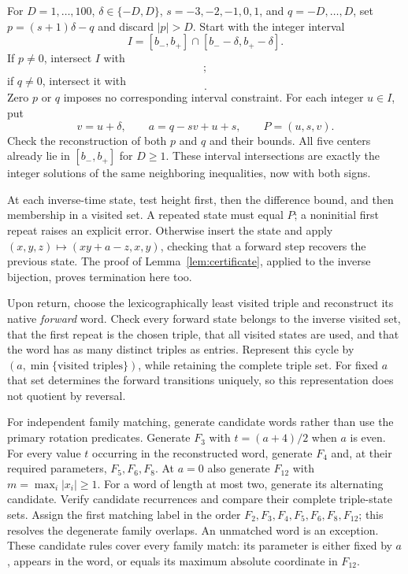 For $D=1,\ldots,100$, $\delta\in\{-D,D\}$,
$s=-3,-2,-1,0,1$, and $q=-D,\ldots,D$, set
$p=(s+1)\delta-q$ and discard $|p|>D$.
Start with the integer interval
\begin{equation}
 I=[b_-,b_+]\cap[b_--\delta,b_+-\delta].
 \label{eq:interval0}
\end{equation}
If $p\ne0$, intersect $I$ with
\begin{equation}
 [-1-\lfloor2D/|p|\rfloor,-1+\lfloor2D/|p|\rfloor];
 \label{eq:intervalp}
\end{equation}
if $q\ne0$, intersect it with
\begin{equation}
 [-1-\delta-\lfloor2D/|q|\rfloor,
  -1-\delta+\lfloor2D/|q|\rfloor].
 \label{eq:intervalq}
\end{equation}
Zero $p$ or $q$ imposes no corresponding interval constraint.
For each integer $u\in I$, put
\begin{equation}
 v=u+\delta,\qquad a=q-sv+u+s,
 \qquad P=(u,s,v).
 \label{eq:independentseed}
\end{equation}
Check the reconstruction of both $p$ and $q$ and their bounds.
All five centers already lie in $[b_-,b_+]$ for $D\ge1$.
These interval intersections are exactly the integer solutions
of the same neighboring inequalities, now with both signs.

At each inverse-time state, test height first, then the difference
bound, and then membership in a visited set. A repeated state
must equal $P$; a noninitial first repeat raises an explicit
error. Otherwise insert the state and apply
$(x,y,z)\mapsto(xy+a-z,x,y)$, checking that a forward step
recovers the previous state. The proof of
Lemma~\ref{lem:certificate}, applied to the inverse bijection,
proves termination here too.

Upon return, choose the lexicographically least visited triple
and reconstruct its native \emph{forward} word. Check every
forward state belongs to the inverse visited set, that the first
repeat is the chosen triple, that all visited states are used,
and that the word has as many distinct triples as entries.
Represent this cycle by $(a,\min\{\text{visited triples}\})$,
while retaining the complete triple set. For fixed $a$ that set
determines the forward transitions uniquely, so this representation
does not quotient by reversal.

For independent family matching, generate candidate words rather
than use the primary rotation predicates. Generate $F_3$ with
$t=(a+4)/2$ when $a$ is even. For every value $t$ occurring
in the reconstructed word, generate $F_4$ and, at their required
parameters, $F_5,F_6,F_8$. At $a=0$ also generate $F_{12}$
with $m=\max_i|x_i|\ge1$. For a word of length at most
two, generate its alternating candidate. Verify candidate
recurrences and compare their complete triple-state sets.
Assign the first matching label in the order
$F_2,F_3,F_4,F_5,F_6,F_8,F_{12}$; this resolves the
degenerate family overlaps. An unmatched word is an exception.
These candidate rules cover every family match: its parameter
is either fixed by $a$, appears in the word, or equals its
maximum absolute coordinate in $F_{12}$.

